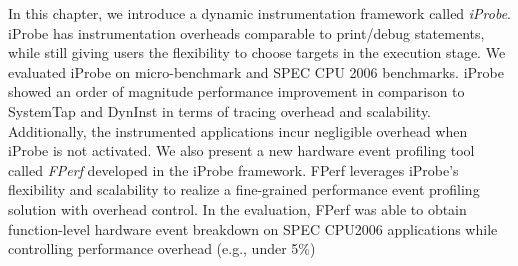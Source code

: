 In this chapter, we introduce a dynamic instrumentation framework called \emph{iProbe}.
iProbe has instrumentation overheads comparable to print/debug statements, while still giving users the flexibility to choose targets in the execution stage. 
We evaluated iProbe on micro-benchmark and SPEC CPU 2006 benchmarks.
iProbe showed an order of magnitude performance improvement in comparison to SystemTap\cite{utrace} and DynInst\cite{dyninst} 
in terms of tracing overhead and scalability.
Additionally, the instrumented applications incur 
negligible overhead when iProbe is not activated.
We also present a new hardware event profiling tool called \emph{FPerf} 
developed in the iProbe framework.  
FPerf leverages iProbe's flexibility and scalability to realize 
a fine-grained performance event profiling solution with overhead control.
In the evaluation, FPerf was able to obtain function-level
hardware event breakdown on SPEC CPU2006 applications 
while controlling performance overhead (e.g., under 5\%)




